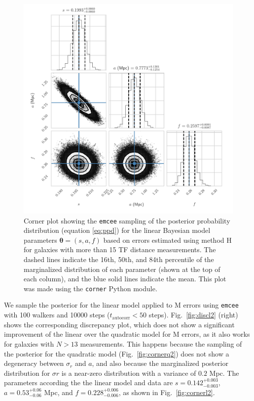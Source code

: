 \documentclass[a4paper,fleqn,usenatbib]{mnras}
\begin{document}
\begin{figure}
	\includegraphics[scale=0.7]{cornerl}
    \caption{Corner plot showing the \texttt{emcee} sampling of the posterior probability distribution (equation \ref{eq:ppd}) for the linear Bayesian model parameters $\pmb{\theta}=(s,a,f)$ based on errors estimated using method H for galaxies with more than 15 TF distance measurements. The dashed lines indicate the 16th, 50th, and 84th percentile of the marginalized distribution of each parameter (shown at the top of each column), and the blue solid lines indicate the mean. This plot was made using the \texttt{corner} Python module.}
    \label{fig:cornerl}
\end{figure}
We sample the posterior for the linear model applied to M errors using \texttt{emcee} with 100 walkers and 10000 steps ($t_\mathrm{autocorr} < 50$ steps). Fig.~\ref{fig:discl2} (right) shows the corresponding discrepancy plot, which does not show a significant improvement of the linear over the quadratic model for M errors, as it also works for galaxies with $N>13$ measurements. This happens because the sampling of the posterior for the quadratic model (Fig.~\ref{fig:cornerq2}) does not show a degeneracy between $\sigma_r$ and $a$, and also because the marginalized posterior distribution for $\sigma r$ is a near-zero distribution with a variance of $0.2$ Mpc. The parameters according the the linear model and data are $s=0.142_{-0.003}^{+0.003}$, $a=0.53_{-0.06}^{+0.06}$ Mpc, and $f=0.228_{-0.006}^{+0.006}$, as shown in Fig.~\ref{fig:cornerl2}. 
\end{document}
